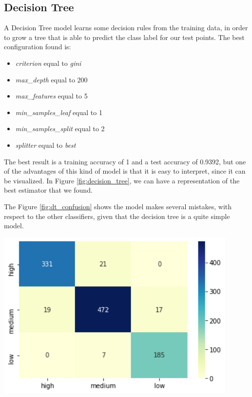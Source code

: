 \subsection{Decision Tree}
\begin{minipage}{0.59\textwidth}
A Decision Tree model learns some decision rules from the training data, in order to grow a tree that is able to predict the class label for our test points. 
The best configuration found is:
\begin{itemize}
\item \emph{criterion} equal to \emph{gini}
\item \emph{max\_depth} equal to 200
\item \emph{max\_features} equal to 5
\item \emph{min\_samples\_leaf} equal to 1
\item \emph{min\_samples\_split} equal to 2
\item \emph{splitter} equal to \emph{best}
\end{itemize}

The best result is a training accuracy of 1 and a test accuracy of 0.9392, but one of the advantages of this kind of model is that it is easy to interpret, since it can be visualized.
In Figure \ref{fig:decision_tree}, we can have a representation of the best estimator that we found.

The Figure \ref{fig:dt_confusion} shows the model makes several mistakes, with respect to the other classifiers, given that the decision tree is a quite simple model.
\end{minipage}
\begin{minipage}{0.4\textwidth}
\centering
\includegraphics[width=0.90\textwidth]{img/dt_confusion.png}
\captionsetup{justification=centering}
\label{fig:dt_confusion}
\end{minipage}

